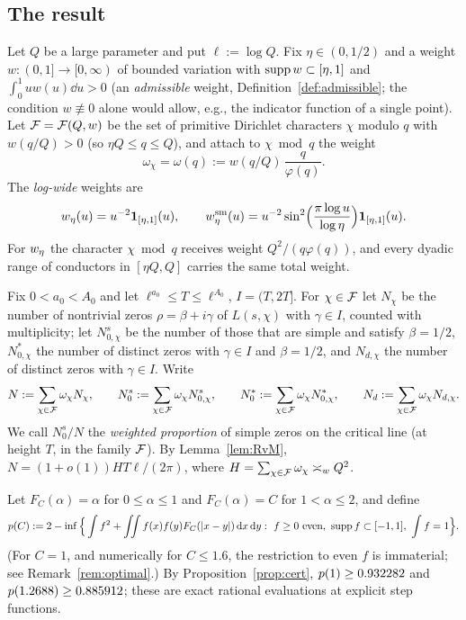 \documentclass[11pt]{amsart}
\theoremstyle{definition}
\theoremstyle{remark}
\numberwithin{equation}{section}
\begin{document}
\subsection{The result}
Let $Q$ be a large parameter and put $\ell:=\log Q$. Fix $\eta\in(0,1/2)$ and a weight $w:(0,1]\to[0,\infty)$ of bounded variation with $\operatorname{supp} w\subset[\eta,1]$ and $\int_0^1uw(u)\dd u>0$ (an \emph{admissible} weight, Definition~\ref{def:admissible}; the condition $w\not\equiv0$ alone would allow, e.g., the indicator function of a single point). Let $\mathcal F=\mathcal F(Q,w)$ be the set of primitive Dirichlet characters $\chi$ modulo $q$ with $w(q/Q)>0$ (so $\eta Q\le q\le Q$), and attach to $\chi\bmod q$ the weight
\begin{equation}\label{eq:omega}
\omega_\chi=\omega(q):=w(q/Q)\,\frac{q}{\varphi(q)} .
\end{equation}
The \emph{log-wide} weights are
\begin{equation}\label{eq:logwide}
w_\eta(u)=u^{-2}\mathbf 1_{[\eta,1]}(u),\qquad w^{\mathrm{sm}}_\eta(u)=u^{-2}\sin^2\!\Big(\frac{\pi\log u}{\log\eta}\Big)\mathbf 1_{[\eta,1]}(u).
\end{equation}
For $w_\eta$ the character $\chi\bmod q$ receives weight $Q^2/(q\varphi(q))$, and every dyadic range of conductors in $[\eta Q,Q]$ carries the same total weight.

Fix $0<a_0<A_0$ and let $\ell^{a_0}\le T\le\ell^{A_0}$, $I=(T,2T]$. For $\chi\in\mathcal F$ let $N_\chi$ be the number of nontrivial zeros $\rho=\beta+i\gamma$ of $L(s,\chi)$ with $\gamma\in I$, counted with multiplicity; let $N^s_{0,\chi}$ be the number of those that are simple and satisfy $\beta=1/2$, $N^*_{0,\chi}$ the number of distinct zeros with $\gamma\in I$ and $\beta=1/2$, and $N_{d,\chi}$ the number of distinct zeros with $\gamma\in I$. Write
\[
N:=\sum_{\chi\in\mathcal F}\omega_\chi N_\chi,\qquad N^s_0:=\sum_{\chi\in\mathcal F}\omega_\chi N^s_{0,\chi},\qquad N^*_0:=\sum_{\chi\in\mathcal F}\omega_\chi N^*_{0,\chi},\qquad N_d:=\sum_{\chi\in\mathcal F}\omega_\chi N_{d,\chi}.
\]
We call $N^s_0/N$ the \emph{weighted proportion} of simple zeros on the critical line (at height $T$, in the family $\mathcal F$). By Lemma~\ref{lem:RvM}, $N=(1+o(1))HT\ell/(2\pi)$, where $H=\sum_{\chi\in\mathcal F}\omega_\chi\asymp_w Q^2$.

Let $F_C(\alpha)=\alpha$ for $0\le\alpha\le1$ and $F_C(\alpha)=C$ for $1<\alpha\le2$, and define
\begin{equation}\label{eq:pC}
\pC(C):=2-\inf\Big\{\int f^2+\iint f(x)f(y)F_C(|x-y|)\dd x\dd y:\ f\ge0\text{ even},\ \supp f\subset[-1,1],\ \int f=1\Big\}.
\end{equation}
(For $C=1$, and numerically for $C\le1.6$, the restriction to even $f$ is immaterial; see Remark~\ref{rem:optimal}.)
By Proposition~\ref{prop:cert}, $p(1)\ge0.932282$ and $p(1.2688)\ge0.885912$; these are exact rational evaluations at explicit step functions.
\end{document}
